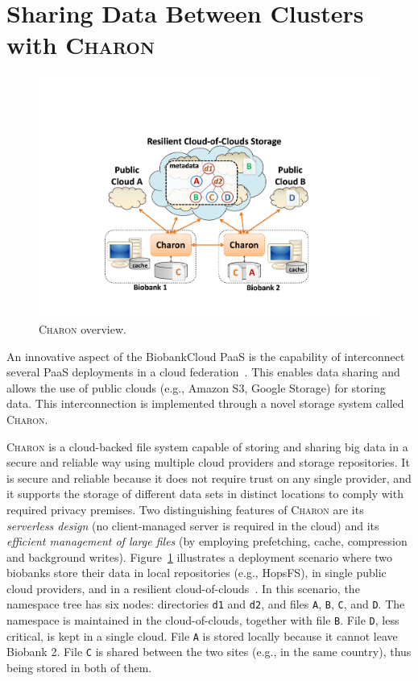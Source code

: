 \section{Sharing Data Between Clusters with \textsc{Charon}}
\vskip-8pt
\begin{figure}[ht]
 \centering
 \includegraphics[width=0.5\columnwidth]{./imgs/charon_arch.pdf}
\caption{\small \textsc{Charon} overview.}
\label{fig:charon}
\end{figure}
\vskip-8pt
An innovative aspect of the BiobankCloud PaaS is the capability of interconnect several PaaS deployments in a cloud federation~\cite{ebb13}. This enables data sharing and allows the use of public clouds (e.g., Amazon S3, Google Storage) for storing data. This interconnection is implemented through a novel storage system called \textsc{Charon}.

\textsc{Charon} is a cloud-backed file system capable of storing and sharing big data in a secure and reliable way using multiple cloud providers and storage repositories. It is secure and reliable because it does not require trust on any single provider, and it supports the storage of different data sets in distinct locations to comply with required privacy premises. Two distinguishing features of \textsc{Charon} are its \emph{serverless design} (no client-managed server is required in the cloud) and its \emph{efficient management of large files} (by employing prefetching, cache, compression and background writes).
Figure~\ref{fig:charon} illustrates a deployment scenario where two biobanks store their data in local repositories (e.g., HopsFS), in single public cloud providers, and in a resilient cloud-of-clouds~\cite{depsky13}. In this scenario, the namespace tree has six nodes: directories \texttt{d1} and \texttt{d2}, and files \texttt{A}, \texttt{B}, \texttt{C}, and \texttt{D}. 
The namespace is maintained in the cloud-of-clouds, together with file \texttt{B}.
File \texttt{D}, less critical, is kept in a single cloud.
File \texttt{A} is stored locally because it cannot leave Biobank 2.
File \texttt{C} is shared between the two sites (e.g., in the same country), thus being stored in both of them.
